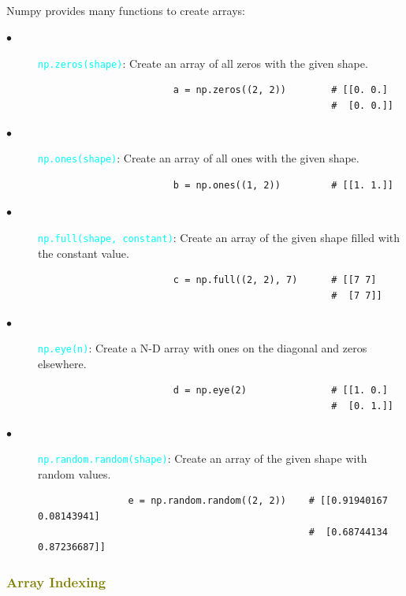 \documentclass{book}
\begin{document}
\\
\vspace{1mm}
Numpy provides many functions to create arrays:
\begin{description}
    \item[$\bullet$] \textcolor{cyan}{\texttt{np.zeros(shape)}}: Create an array of all zeros with the given shape.
    \begin{lstlisting}
                        a = np.zeros((2, 2))        # [[0. 0.]
                                                    #  [0. 0.]]
    \end{lstlisting}
    \item[$\bullet$] \textcolor{cyan}{\texttt{np.ones(shape)}}: Create an array of all ones with the given shape.
    \begin{lstlisting}
                        b = np.ones((1, 2))         # [[1. 1.]]
    \end{lstlisting}
    \item[$\bullet$] \textcolor{cyan}{\texttt{np.full(shape, constant)}}: Create an array of the given shape filled with the constant value.
    \begin{lstlisting}
                        c = np.full((2, 2), 7)      # [[7 7]
                                                    #  [7 7]]
    \end{lstlisting}
    \item[$\bullet$] \textcolor{cyan}{\texttt{np.eye(n)}}: Create a N-D array with ones on the diagonal and zeros elsewhere.
    \begin{lstlisting}
                        d = np.eye(2)               # [[1. 0.]
                                                    #  [0. 1.]]
    \end{lstlisting}
    \item[$\bullet$] \textcolor{cyan}{\texttt{np.random.random(shape)}}: Create an array of the given shape with random values.
    \begin{lstlisting}
                e = np.random.random((2, 2))    # [[0.91940167 0.08143941]
                                                #  [0.68744134 0.87236687]]
    \end{lstlisting}
\end{description}
\textcolor{olive}{\subsubsection{Array Indexing}}
\end{document}
